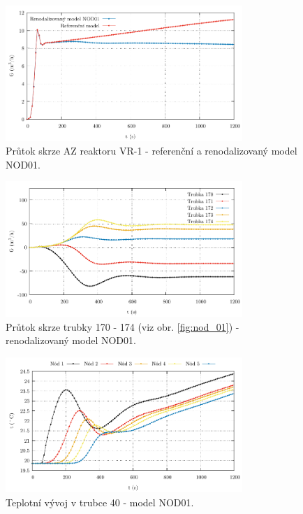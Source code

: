  \begin{figure}[H]
 	\centering
 	\includegraphics[width=0.8\textwidth]{./05_TH_model_VR_1/grafy/nod_01_mass_flow_rate_vertical.pdf}
 	\caption{Průtok skrze AZ reaktoru VR-1 - referenční a renodalizovaný model NOD01. }
 	\label{fig:nod_01_mass_flow_rate_vertical}
 \end{figure}
\begin{figure}[H]
	\centering
	\includegraphics[width=0.8\textwidth]{./05_TH_model_VR_1/grafy/nod_01_mass_flow_rate_horizontal.pdf}
	\caption{Průtok skrze trubky 170 - 174 (viz obr. \ref{fig:nod_01}) - renodalizovaný model NOD01.}
	\label{fig:nod_01_mass_flow_rate_horizontal}
\end{figure}
\begin{figure}[H]
	\centering
	\includegraphics[width=0.8\textwidth]{./05_TH_model_VR_1/grafy/t_nod_01.pdf}
	\caption{Teplotní vývoj v trubce 40 - model NOD01.}
	\label{fig:nod_01_temp_pipe_40}
\end{figure}

